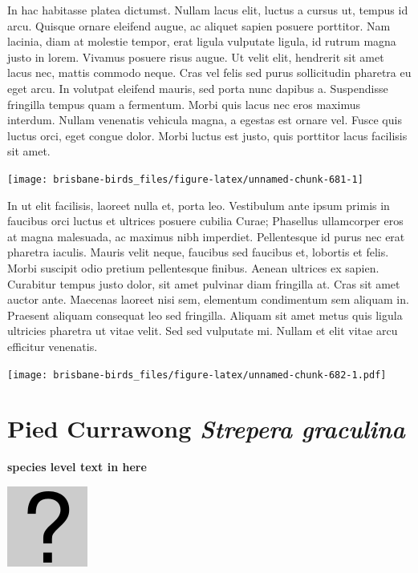 \documentclass[]{book}
\let\origfigure\figure
\let\endorigfigure\endfigure
\renewenvironment{figure}[1][2] {
  \expandafter\origfigure\expandafter[H]
} {
  \endorigfigure
}
\begin{document}
In hac habitasse platea dictumst. Nullam lacus elit, luctus a cursus ut,
tempus id arcu. Quisque ornare eleifend augue, ac aliquet sapien posuere
porttitor. Nam lacinia, diam at molestie tempor, erat ligula vulputate
ligula, id rutrum magna justo in lorem. Vivamus posuere risus augue. Ut
velit elit, hendrerit sit amet lacus nec, mattis commodo neque. Cras vel
felis sed purus sollicitudin pharetra eu eget arcu. In volutpat eleifend
mauris, sed porta nunc dapibus a. Suspendisse fringilla tempus quam a
fermentum. Morbi quis lacus nec eros maximus interdum. Nullam venenatis
vehicula magna, a egestas est ornare vel. Fusce quis luctus orci, eget
congue dolor. Morbi luctus est justo, quis porttitor lacus facilisis sit
amet.

\begin{figure}
\texttt{[image: brisbane-birds\_files/figure-latex/unnamed-chunk-681-1]} \caption{insert figure caption}\label{fig:unnamed-chunk-681}
\end{figure}

In ut elit facilisis, laoreet nulla et, porta leo. Vestibulum ante ipsum
primis in faucibus orci luctus et ultrices posuere cubilia Curae;
Phasellus ullamcorper eros at magna malesuada, ac maximus nibh
imperdiet. Pellentesque id purus nec erat pharetra iaculis. Mauris velit
neque, faucibus sed faucibus et, lobortis et felis. Morbi suscipit odio
pretium pellentesque finibus. Aenean ultrices ex sapien. Curabitur
tempus justo dolor, sit amet pulvinar diam fringilla at. Cras sit amet
auctor ante. Maecenas laoreet nisi sem, elementum condimentum sem
aliquam in. Praesent aliquam consequat leo sed fringilla. Aliquam sit
amet metus quis ligula ultricies pharetra ut vitae velit. Sed sed
vulputate mi. Nullam et elit vitae arcu efficitur venenatis.

\begin{figure}
\centering
\texttt{[image: brisbane-birds\_files/figure-latex/unnamed-chunk-682-1.pdf]}
\caption{\label{fig:unnamed-chunk-682}insert figure caption}
\end{figure}

\section{\texorpdfstring{Pied Currawong \emph{Strepera
graculina}}{Pied Currawong Strepera graculina}}\label{pied-currawong-strepera-graculina}

\textbf{species level text in here}

\begin{figure}
\centering
\includegraphics{assets/missing.png}
\caption{No image for species}
\end{figure}
\end{document}
